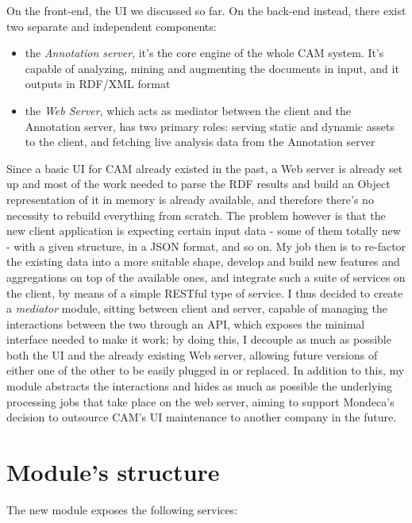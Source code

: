 \documentclass[12pt,oneside,svgnames]{memoir}
\begin{document}
On the front-end, the UI we discussed so far. On the back-end instead,
there exist two separate and independent components:

\begin{itemize}
\itemsep1pt\parskip0pt
\item
  the \emph{Annotation server}, it's the core engine of the whole CAM
  system. It's capable of analyzing, mining and augmenting the documents
  in input, and it outputs in RDF/XML format
\item
  the \emph{Web Server}, which acts as mediator between the client and
  the Annotation server, has two primary roles: serving static and
  dynamic assets to the client, and fetching live analysis data from the
  Annotation server
\end{itemize}

Since a basic UI for CAM already existed in the past, a Web server is
already set up and most of the work needed to parse the RDF results and
build an Object representation of it in memory is already available, and
therefore there's no necessity to rebuild everything from scratch. The
problem however is that the new client application is expecting certain
input data - some of them totally new - with a given structure, in a
JSON format, and so on. My job then is to re-factor the existing data
into a more suitable shape, develop and build new features and
aggregations on top of the available ones, and integrate such a suite of
services on the client, by means of a simple RESTful type of service. I
thus decided to create a \emph{mediator} module, sitting between client
and server, capable of managing the interactions between the two through
an API, which exposes the minimal interface needed to make it work; by
doing this, I decouple as much as possible both the UI and the already
existing Web server, allowing future versions of either one of the other
to be easily plugged in or replaced. In addition to this, my module
abstracts the interactions and hides as much as possible the underlying
processing jobs that take place on the web server, aiming to support
Mondeca's decision to outsource CAM's UI maintenance to another company
in the future.

\section{Module's structure}\label{modules-structure}

The new module exposes the following services:
\end{document}
